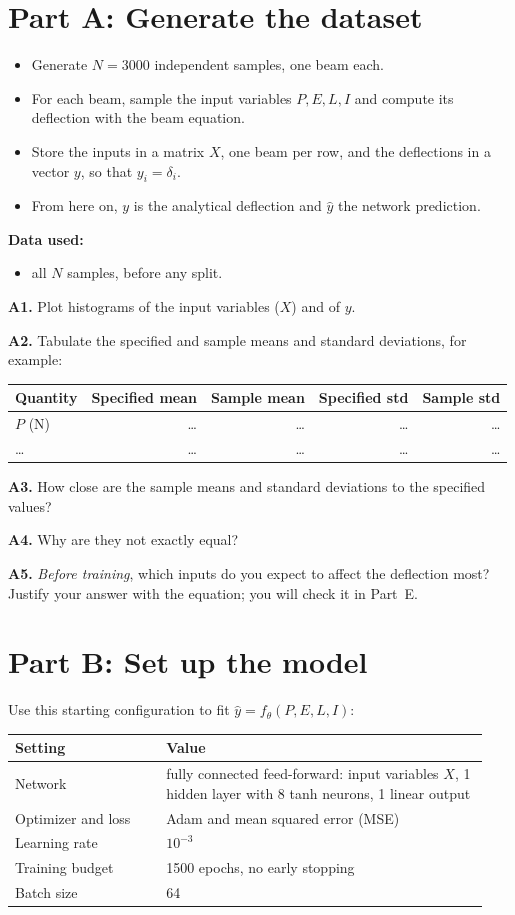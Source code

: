 \documentclass[11pt]{article}
\newcommand{\question}[2]{\par\noindent\textbf{#1.} #2\par}
\newcommand{\datause}[1]{\par\smallskip\needspace{4\baselineskip}\noindent\textbf{Data used:}\nopagebreak\begin{itemize}#1\end{itemize}}
\begin{document}
\section*{Part A: Generate the dataset}
\begin{itemize}
  \item \aitrap Generate $N=3000$ independent samples, one beam each.
  \item For each beam, sample the input variables $P,E,L,I$ and compute its deflection with the beam equation.
  \item Store the inputs in a matrix $X$, one beam per row, and the deflections in a vector $y$, so that $y_i=\delta_i$.
  \item From here on, $y$ is the analytical deflection and $\hat y$ the network prediction.
\end{itemize}
\datause{\item all $N$ samples, before any split.}

\question{A1}{Plot histograms of the input variables ($X$) and of $y$.}
\question{A2}{Tabulate the specified and sample means and standard deviations, for example:}
\begin{center}
\small
\begin{tabular}{@{}lrrrr@{}}
\toprule
Quantity & Specified mean & Sample mean & Specified std & Sample std \\
\midrule
$P$ (N) & \dots & \dots & \dots & \dots \\
\dots & \dots & \dots & \dots & \dots \\
\bottomrule
\end{tabular}
\end{center}

\question{A3}{How close are the sample means and standard deviations to the specified values?}
\question{A4}{Why are they not exactly equal?}
\question{A5}{\emph{Before training}, which inputs do you expect to affect the deflection most? Justify your answer with the equation; you will check it in Part~E.}

\section*{Part B: Set up the model}
\aitrap Use this starting configuration to fit $\hat y=f_\theta(P,E,L,I)$:

\begin{center}
\begin{tabular}{@{}p{0.3\linewidth}p{0.64\linewidth}@{}}
\toprule
Setting & Value \\
\midrule
Network & fully connected feed-forward: input variables $X$, 1 hidden layer with 8 tanh neurons, 1 linear output \\
Optimizer and loss & Adam and mean squared error (MSE) \\
Learning rate & $10^{-3}$ \\
Training budget & 1500 epochs, no early stopping \\
Batch size & 64 \\
\bottomrule
\end{tabular}
\end{center}
\end{document}

